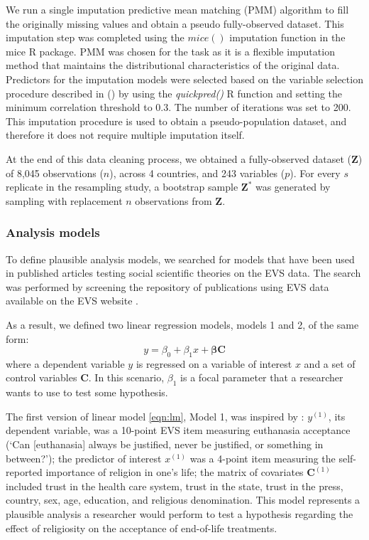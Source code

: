 	We run a single imputation predictive mean matching (PMM) algorithm to fill the originally missing values 
	and obtain a pseudo fully-observed dataset.
	This imputation step was completed using the $mice()$ imputation function in the mice R package.
	PMM was chosen for the task as it is a flexible imputation method that maintains the distributional 
	characteristics of the original data.
	Predictors for the imputation models were selected based on the variable selection procedure described in
	\citeauthor{vanBuurenEtAl:1999} (\citeyear[pp. 687–688]{vanBuurenEtAl:1999}) by using the \emph{quickpred()}
	R function and setting the minimum correlation threshold to 0.3.
	The number of iterations was set to 200.
	This imputation procedure is used to obtain a pseudo-population dataset, and therefore it does not require
	multiple imputation itself.

	At the end of this data cleaning process, we obtained a fully-observed dataset ($\bm{Z}$) of 8,045 observations 
	($n$), across 4 countries, and 243 variables ($p$).
	For every $s$ replicate in the resampling study, a bootstrap sample $\bm{Z}^{*}$ was 
	generated by sampling with replacement $n$ observations from $\bm{Z}$.

\subsubsection{Analysis models}

	To define plausible analysis models, we searched for models that have been used in published articles
	testing social scientific theories on the EVS data.
	The search was performed by screening the repository of publications using EVS data available on the EVS 
	website \citep{EVSbib}.

	As a result, we defined two linear regression models, models 1 and 2, of the same form:
%	
	\begin{equation}
		y = \beta_{0} + \beta_{1} x + \bm{\beta} \bm{C}  \label{eqn:lm}
	\end{equation}
%
	where a dependent variable $y$ is regressed on a variable of interest $x$ and a set of control variables
	$\bm{C}$.
	In this scenario, $\beta_{1}$ is a focal parameter that a researcher wants to use to test some hypothesis.

	The first version of linear model \eqref{eqn:lm}, Model 1, was inspired by \cite{koneke:2014}:
	$y^{(1)}$, its dependent variable, was a 10-point EVS item measuring euthanasia acceptance 
	(`Can [euthanasia] always be justified, never be justified, or something in between?');
	the predictor of interest $x^{(1)}$ was a 4-point item measuring the self-reported importance of religion in 
	one's life;
	the matrix of covariates $\bm{C}^{(1)}$ included trust in the health care system, trust in the state, 
	trust in the press, country, sex, age, education, and religious denomination.
	This model represents a plausible analysis a researcher would perform to test a hypothesis regarding the 
	effect of religiosity on the acceptance of end-of-life treatments.

